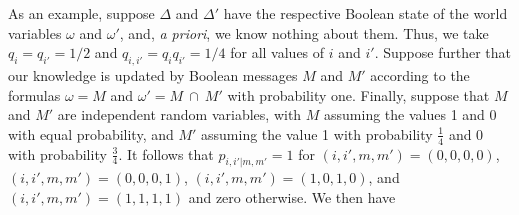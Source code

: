 \documentclass[11pt]{article}
\begin{document}
As an example, suppose $\Delta$ and $\Delta'$ have the
respective Boolean state of the world variables $\omega$ and $\omega'$, and, {\it a priori}, we know nothing about them.  Thus, we take $q_i = q_{i'} = 1/2$ and $q_{i,i'} = q_i q_{i'} = 1/4$ 
for all values of $i$ and $i'$.  Suppose further that our knowledge is updated by Boolean messages $M$ and $M'$ according to the formulas $\omega = M$ and $\omega' = M\ \cap \ M'$ with probability one. 
Finally, suppose that $M$ and $M'$ are independent random variables, with $M$ assuming the values 1 and 0 with equal probability, and $M'$ assuming the value 1 with probability $\frac{1}{4}$ and 0 with 
probability $\frac{3}{4}$.  It follows that $p_{i, i'|m, m'} = 1$ for $(i, i', m, m') = (0, 0, 0, 0)$, $(i, i', m, m') = (0, 0, 0, 1)$, $(i, i', m, m') = (1, 0, 1, 0)$, and $(i, i', m, m') = (1, 1, 1, 1)$ and zero otherwise.  We then have
\end{document}
